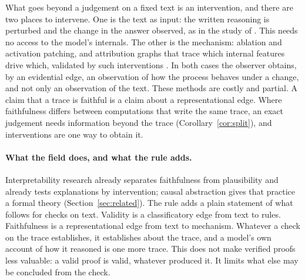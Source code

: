 What goes beyond a judgement on a fixed text is an intervention, and there are two
places to intervene. One is the text as input: the written reasoning is perturbed and
the change in the answer observed, as in the study of \citet{lanham2023}. This needs no
access to the model's internals. The other is the mechanism: ablation and activation
patching, and attribution graphs that trace which internal features drive which,
validated by such interventions \citep{lindsey2025}. In both cases the observer
obtains, by an evidential edge, an observation of how the process behaves under a
change, and not only an observation of the text. These methods are costly and partial.
A claim that a trace is faithful is a claim about a representational edge. Where
faithfulness differs between computations that write the same trace, an exact judgement
needs information beyond the trace (Corollary~\ref{cor:split}), and interventions are
one way to obtain it.

\paragraph{What the field does, and what the rule adds.} Interpretability research
already separates faithfulness from plausibility and already tests explanations by
intervention; causal abstraction gives that practice a formal theory
(Section~\ref{sec:related}). The rule adds a plain statement of what follows for checks
on text. Validity is a classificatory edge from text to rules. Faithfulness is a
representational edge from text to mechanism. Whatever a check on the trace establishes,
it establishes about the trace, and a model's own account of how it reasoned is one more
trace. This does not make verified proofs less valuable: a valid proof is valid, whatever
produced it. It limits what else may be concluded from the check.
